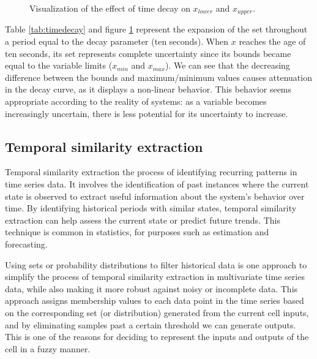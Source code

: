 \begin{figure}[h!]
\begin{floatrow}
{    }{%
      \caption{Visualization of the effect of time decay on $x_{lower}$ and $x_{upper}$.}%
      \label{fig:timedecay}
    }
    \end{floatrow}
    \end{figure}


Table \ref{tab:timedecay} and figure \ref{fig:timedecay} represent the expansion of the set throughout a period equal to the decay parameter (ten seconds). When $x$ reaches the age of ten seconds, its set represents complete uncertainty since its bounds became equal to the variable limits ($x_{min}$ and $x_{max}$). We can see that the decreasing difference between the bounds and maximum/minimum values causes attenuation in the decay curve, as it displays a non-linear behavior. This behavior seems appropriate according to the reality of systems: as a variable becomes increasingly uncertain, there is less potential for its uncertainty to increase.


\subsection{Temporal similarity extraction} \label{subsec:tempsim}

Temporal similarity extraction the process of identifying recurring patterns in time series data. It involves the identification of past instances where the current state is observed to extract useful information about the system's behavior over time. By identifying historical periods with similar states, temporal similarity extraction can help assess the current state or predict future trends. This technique is common in statistics, for purposes such as estimation and forecasting.

Using sets or probability distributions to filter historical data is one approach to simplify the process of temporal similarity extraction in multivariate time series data, while also making it more robust against noisy or incomplete data. This approach assigns membership values to each data point in the time series based on the corresponding set (or distribution) generated from the current cell inputs, and by eliminating samples past a certain threshold we can generate outputs. This is one of the reasons for deciding to represent the inputs and outputs of the cell in a fuzzy manner. 

